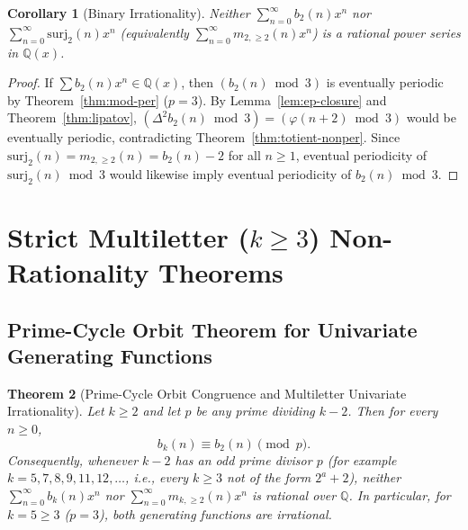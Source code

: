 \documentclass[11pt,a4paper]{article}
\newtheorem{theorem}{Theorem}[section]
\newtheorem{corollary}[theorem]{Corollary}
\theoremstyle{definition}
\newcommand{\Q}{\mathbb{Q}}
\newcommand{\surj}{\mathrm{surj}}
\begin{document}
\begin{corollary}[Binary Irrationality]
\label{cor:bin-irrat}
Neither $\sum_{n=0}^{\infty} b_2(n) x^n$ nor $\sum_{n=0}^{\infty} \surj_2(n) x^n$ (equivalently $\sum_{n=0}^\infty m_{2,\ge 2}(n)x^n$) is a rational power series in $\Q(x)$.
\end{corollary}

\begin{proof}
If $\sum b_2(n)x^n \in \Q(x)$, then $(b_2(n) \bmod 3)$ is eventually periodic by Theorem~\ref{thm:mod-per} ($p = 3$). By Lemma~\ref{lem:ep-closure} and Theorem~\ref{thm:lipatov}, $(\Delta^2 b_2(n) \bmod 3) = (\varphi(n + 2) \bmod 3)$ would be eventually periodic, contradicting Theorem~\ref{thm:totient-nonper}. Since $\surj_2(n) = m_{2,\ge 2}(n) = b_2(n) - 2$ for all $n \ge 1$, eventual periodicity of $\surj_2(n) \bmod 3$ would likewise imply eventual periodicity of $b_2(n) \bmod 3$.
\end{proof}

\section{Strict Multiletter (\texorpdfstring{$k \ge 3$}{k >= 3}) Non-Rationality Theorems}

\subsection{Prime-Cycle Orbit Theorem for Univariate Generating Functions}

\begin{theorem}[Prime-Cycle Orbit Congruence and Multiletter Univariate Irrationality]
\label{thm:prime-orbit}
Let $k \ge 2$ and let $p$ be any prime dividing $k - 2$. Then for every $n \ge 0$,
\[
  b_k(n) \equiv b_2(n) \pmod p.
\]
Consequently, whenever $k - 2$ has an odd prime divisor $p$ (for example $k = 5, 7, 8, 9, 11, 12, \dots$, i.e., every $k \ge 3$ not of the form $2^a + 2$), \emph{neither} $\sum_{n=0}^\infty b_k(n)x^n$ \emph{nor} $\sum_{n=0}^\infty m_{k,\ge 2}(n)x^n$ is rational over $\Q$. In particular, for $k = 5 \ge 3$ ($p = 3$), both generating functions are irrational.
\end{theorem}
\end{document}
